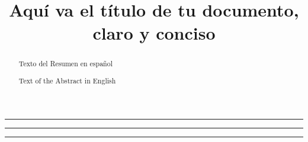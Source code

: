 \documentclass[12pt,a4paper,times]{apa7}
\title{Aquí va el título de tu documento, claro y conciso}
\begin{document}
\maketitle

\hrule

\begin{abstract}
Texto del Resumen en español
\end{abstract}


\hrule

\begin{abstract}
Text of the Abstract in English
\end{abstract}
\hrule

\end{document}
